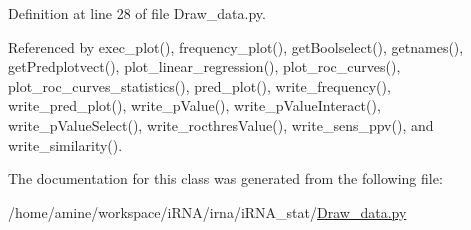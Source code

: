 \-Definition at line 28 of file \-Draw\-\_\-data.\-py.



\-Referenced by exec\-\_\-plot(), frequency\-\_\-plot(), get\-Boolselect(), getnames(), get\-Predplotvect(), plot\-\_\-linear\-\_\-regression(), plot\-\_\-roc\-\_\-curves(), plot\-\_\-roc\-\_\-curves\-\_\-statistics(), pred\-\_\-plot(), write\-\_\-frequency(), write\-\_\-pred\-\_\-plot(), write\-\_\-p\-Value(), write\-\_\-p\-Value\-Interact(), write\-\_\-p\-Value\-Select(), write\-\_\-rocthres\-Value(), write\-\_\-sens\-\_\-ppv(), and write\-\_\-similarity().



\-The documentation for this class was generated from the following file\-:\begin{DoxyCompactItemize}
\item 
/home/amine/workspace/i\-R\-N\-A/irna/i\-R\-N\-A\-\_\-stat/\hyperlink{Draw__data_8py}{\-Draw\-\_\-data.\-py}\end{DoxyCompactItemize}
